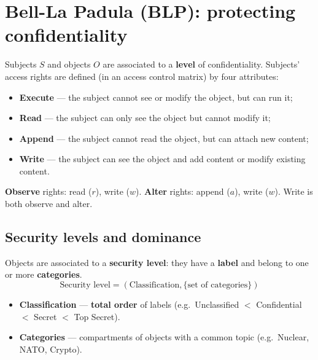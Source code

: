 \section{Bell-La Padula (BLP): protecting confidentiality}

\begin{defnbox}[title=Bell-La Padula model (BLP)]
Subjects $S$ and objects $O$ are associated to a \textbf{level} of confidentiality.
Subjects' access rights are defined (in an access control matrix) by four attributes:
\begin{itemize}
  \item \textbf{Execute} --- the subject cannot see or modify the object, but can run it;
  \item \textbf{Read} --- the subject can only see the object but cannot modify it;
  \item \textbf{Append} --- the subject cannot read the object, but can attach new
        content;
  \item \textbf{Write} --- the subject can see the object and add content or modify
        existing content.
\end{itemize}
\end{defnbox}

\begin{rembox}[title=Observe vs.\ alter]
\textbf{Observe} rights: read ($r$), write ($w$). \textbf{Alter} rights: append ($a$),
write ($w$). Write is both observe and alter.
\end{rembox}

\subsection{Security levels and dominance}

\begin{defnbox}[title=Security level (classification of objects)]
Objects are associated to a \textbf{security level}: they have a \textbf{label} and
belong to one or more \textbf{categories}.
\[
  \text{Security level} = (\text{Classification}, \{\text{set of categories}\})
\]
\begin{itemize}
  \item \textbf{Classification} --- \textbf{total order} of labels (e.g.\
        Unclassified $<$ Confidential $<$ Secret $<$ Top Secret).
  \item \textbf{Categories} --- compartments of objects with a common topic (e.g.\
        Nuclear, NATO, Crypto).
\end{itemize}
\end{defnbox}

